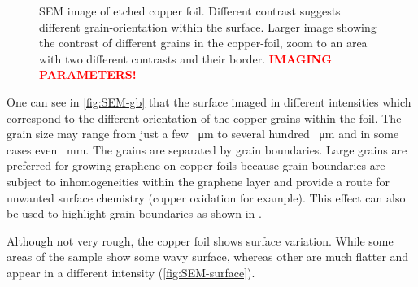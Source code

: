 	\begin{figure}[] \centering
		 \quad
		\caption{SEM image of etched copper foil. Different contrast suggests different grain-orientation within the surface.  Larger image showing the contrast of different grains in the copper-foil,  zoom to an area with two different contrasts and their border. \textcolor{red}{\textbf{IMAGING PARAMETERS!}}}
		\label{fig:SEM-gb}
	\end{figure}
	
	One can see in \autoref{fig:SEM-gb} that the surface imaged in different intensities which correspond to the different orientation of the copper grains within the foil\cite{wu_effects_2015}. The grain size may range from just a few \SI{}{\micro \meter} to several hundred \SI{}{\micro \meter} and in some cases even \SI{}{\milli \meter}. The grains are separated by grain boundaries. Large grains are preferred for growing graphene on copper foils because grain boundaries are subject to inhomogeneities within the graphene layer and provide a route for unwanted surface chemistry (copper oxidation for example). This effect can also be used to highlight grain boundaries as shown in \cite{wu_effects_2015}.
	
	Although not very rough, the copper foil shows surface variation. While some areas of the sample show some wavy surface, whereas other are much flatter and appear in a different intensity (\autoref{fig:SEM-surface}).
	
